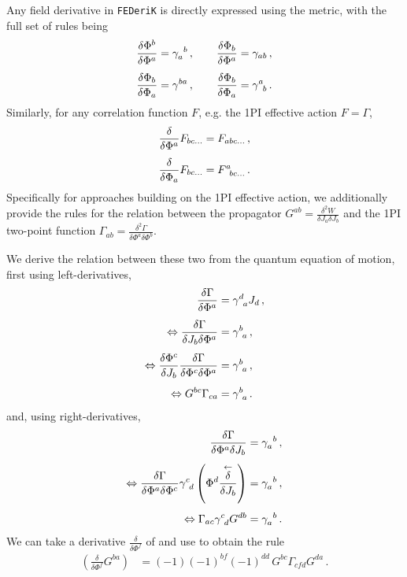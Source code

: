 \documentclass[10pt,prd,nofootinbib,superscriptaddress,twocolumn]{revtex4-2}
\newcommand{\FEDeriK}{\texttt{FEDeriK}\xspace}
\begin{document}
Any field derivative in \FEDeriK is directly expressed using the metric, with the full set of rules being
%
\begin{align}
	\frac{\delta \Phi^b}{\delta \Phi^a} &= \gamma_a^{\phantom{a}b}
	\,,\qquad
	\frac{\delta \Phi_b}{\delta \Phi^a} = \gamma_{ab}
	\,,\notag\\[1ex]
	\frac{\delta \Phi_b}{\delta \Phi_a} &= \gamma^{ba}
	\,,\qquad
	\frac{\delta \Phi_b}{\delta \Phi_a} = \gamma^{a}_{\phantom{a}b}
	\,.
\end{align}
%
Similarly, for any correlation function $F$, e.g. the 1PI effective action $F=\Gamma$, 
%
\begin{align}
	\frac{\delta }{\delta \Phi^a} F_{bc\ldots} = F_{abc\ldots}
	\,,\notag\\[1ex]
	\frac{\delta }{\delta \Phi_a} F_{bc\ldots} = F^{a}_{\phantom{a}bc\ldots}
	\,.
\end{align}
%
Specifically for approaches building on the 1PI effective action, we additionally provide the rules for the relation between the propagator $G^{ab} = \frac{\delta^2 W}{\delta J_a \delta J_b}$ and the 1PI two-point function $\Gamma_{ab} = \frac{\delta^2 \Gamma}{\delta \Phi^a \delta \Phi^b}$. 

We derive the relation between these two from the quantum equation of motion, first using left-derivatives,
%
\begin{align}\label{eq:propInvLeft}
	\frac{\delta \Gamma}{\delta \Phi^a} &= \gamma^d_{\phantom{d}a}J_d
	\,,\notag\\[1ex]\Leftrightarrow 
	\frac{\delta \Gamma}{\delta J_b\delta \Phi^a} &= \gamma^b_{\phantom{b}a}
	\,,\notag\\[1ex]\Leftrightarrow 
	\frac{\delta \Phi^c}{\delta J_b}\frac{\delta \Gamma}{\delta \Phi^c\delta \Phi^a} &= \gamma^b_{\phantom{b}a}
	\,,\notag\\[1ex]\Leftrightarrow 
	G^{bc}\Gamma_{ca} &= \gamma^b_{\phantom{b}a}
	\,.
\end{align}
%
and, using right-derivatives,
%
\begin{align}\label{eq:propInvRight}
	\frac{\delta \Gamma}{\delta \Phi^a\delta J_b} &= \gamma_a^{\phantom{a}b}
	\,,\notag\\[1ex]\Leftrightarrow 
	\frac{\delta \Gamma}{\delta \Phi^a\delta \Phi^c}\gamma^c_{\phantom{c}d}\left(\Phi^d\frac{\overset{\leftarrow}{\delta}}{\delta J_b}\right) &= \gamma_a^{\phantom{a}b}
	\,,\notag\\[1ex]\Leftrightarrow 
	\Gamma_{ac}\gamma^c_{\phantom{c}d}G^{db} &= \gamma_a^{\phantom{a}b}
	\,.
\end{align}
%
We can take a derivative $\frac{\delta}{\delta\Phi^f}$ of  and use  to obtain the rule
%
\begin{align}
	\left(\frac{\delta}{\delta \Phi^f}G^{ba}\right) 
	&= (-1)(-1)^{bf}(-1)^{dd}\, G^{bc}\Gamma_{cfd}G^{da}\,.
\end{align}
%
\end{document}
